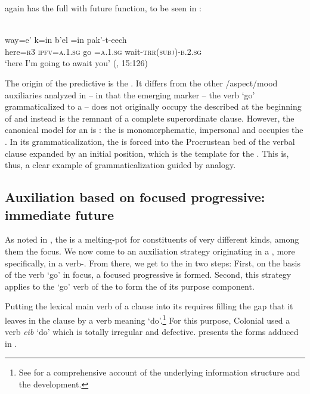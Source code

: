 \documentclass[output=paper]{langsci/langscibook}
\begin{document}
 again has the full  with future function, to be seen in :

\ea\label{ex:lehmann:71}
\\
\gll       way=e’  k=in b’el      =in pak’-t-eech\\
  here=\textsc{r3}  \textsc{ipfv=a.1.sg} go  =\textsc{a.1.sg}    wait-\textsc{trr(subj)-b.2.sg}\\
\glt ‘here I’m going to await you’ (\citealt{Hofling1991}, 15:126)
\z

The origin of the predictive  is the . It differs from the other /aspect/mood auxiliaries analyzed in – in that the emerging marker – the verb `go' grammaticalized to a  – does not originally occupy the  described at the beginning of  and instead is the remnant of a complete superordinate clause. However, the canonical model for an  is : the  is monomorphematic, impersonal and occupies the . In its grammaticalization, the  is forced into the Procrustean bed of the verbal clause expanded by an initial position, which is the template for the . This is, thus, a clear example of grammaticalization guided by analogy.

\subsection{Auxiliation based on focused progressive: immediate future}\label{sec:lehmann:4.9}

As noted in , the  is a melting-pot for constituents of very different kinds, among them the focus. We now come to an auxiliation strategy originating in a , more specifically, in a verb-. From there, we get to the  in two steps: First, on the basis of the verb `go' in focus, a focused progressive is formed. Second, this strategy applies to the `go' verb of the  to form the  of its purpose component.

Putting the lexical main verb of a clause into its  requires filling the gap that it leaves in the  clause by a verb meaning ‘do’.\footnote{See \citet[§~4.3]{Lehmann2008} for a comprehensive account of the underlying information structure and the  development.} For this purpose, Colonial   used a verb \textit{cib} ‘do’ which is totally irregular and defective.  presents the forms adduced in \citet[71f]{Coronel1620}.
\end{document}

